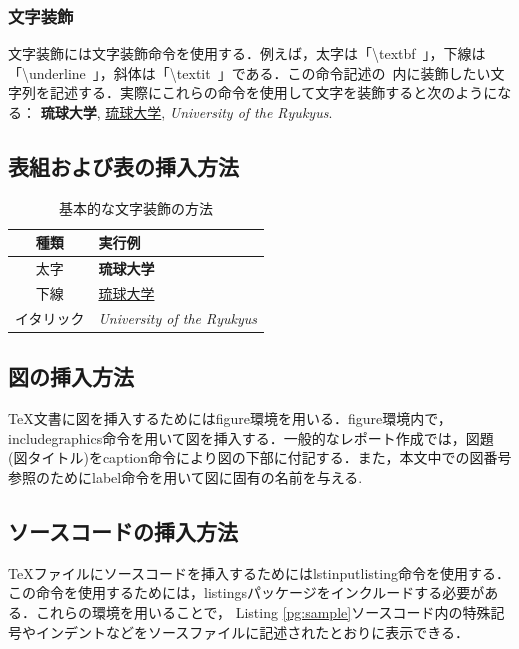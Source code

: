 \documentclass[a4paper, 11pt, titlepage]{jsarticle}
\begin{document}
\subsubsection{文字装飾}
文字装飾には文字装飾命令を使用する．例えば，太字は「\textbackslash textbf{\ }」，下線は「\textbackslash underline{\ }」，斜体は「\textbackslash textit{\ }」である．この命令記述の{\ }内に装飾したい文字列を記述する．実際にこれらの命令を使用して文字を装飾すると次のようになる： \textbf{琉球大学}, \underline{琉球大学}, \textit{University of the Ryukyus}.

\subsection{表組および表の挿入方法}
\begin{table}[htbp]
\caption{基本的な文字装飾の方法}
\label{tabel1}
       \centering
	\begin{tabular}{|c||l|}
           \hline
           種類 & 実行例\\
           \hline
           \hline
           太字 & \textbf{琉球大学}\\
           \hline
           下線        & \underline{琉球大学}\\
           \hline
           イタリック    & \textit{University of the Ryukyus}\\
           \hline
       \end{tabular}
\end{table}
     
\subsection{図の挿入方法}
\TeX 文書に図を挿入するためにはfigure環境を用いる．figure環境内で，includegraphics命令を用いて図を挿入する．一般的なレポート作成では，図題(図タイトル)をcaption命令により図の下部に付記する．また，本文中での図番号参照のためにlabel命令を用いて図に固有の名前を与える.

\subsection{ソースコードの挿入方法}
\TeX ファイルにソースコードを挿入するためにはlstinputlisting命令を使用する．この命令を使用するためには，listingsパッケージをインクルードする必要がある．これらの環境を用いることで， Listing \ref{pg:sample}ソースコード内の特殊記号やインデントなどをソースファイルに記述されたとおりに表示できる．
\end{document}
